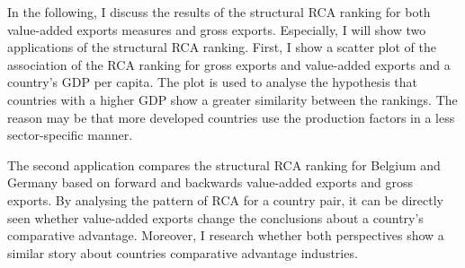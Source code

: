 In the following, I discuss the results of the structural RCA ranking for both value-added exports measures and gross exports.
Especially, I will show two applications of the structural RCA ranking.
First, I show a scatter plot of the association of the RCA ranking for gross exports and value-added exports and a country's GDP per capita.
The plot is used to analyse the hypothesis that countries with a higher GDP show a greater similarity between the rankings.
The reason may be that more developed countries use the production factors in a less sector-specific manner. \par
The second application compares the structural RCA ranking for Belgium and Germany based on forward and backwards value-added exports and gross exports.
By analysing the pattern of RCA for a country pair, it can be directly seen whether value-added exports change the conclusions about a country's comparative advantage.
Moreover, I research whether both perspectives show a similar story about countries comparative advantage industries.
